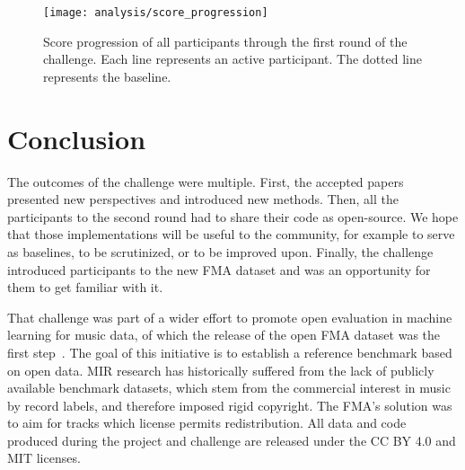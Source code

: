 \documentclass[sigconf]{acmart}
\begin{document}

\begin{figure}[t]
\centering
\texttt{[image: analysis/score\_progression]}
\caption{Score progression of all participants through the first round of the challenge. Each line represents an active participant.
The dotted line represents the baseline.}
\label{fig:timeline}
\end{figure}

\section{Conclusion}

The outcomes of the challenge were multiple. First, the accepted papers presented new perspectives and introduced new methods. Then, all the participants to the second round had to share their code as open-source. We hope that those implementations will be useful to the community, for example to serve as baselines, to be scrutinized, or to be improved upon. Finally, the challenge introduced participants to the new FMA dataset and was an opportunity for them to get familiar with it.

That challenge was part of a wider effort to promote open evaluation in machine learning for music data, of which the release of the open FMA dataset was the first step~\cite{fma_dataset}. The goal of this initiative is to establish a reference benchmark based on open data. MIR research has historically suffered from the lack of publicly available benchmark datasets, which stem from the commercial interest in music by record labels, and therefore imposed rigid copyright. The FMA's solution was to aim for tracks which license permits redistribution. All data and code produced during the project and challenge are released under the CC BY 4.0 and MIT licenses.




\end{document}
